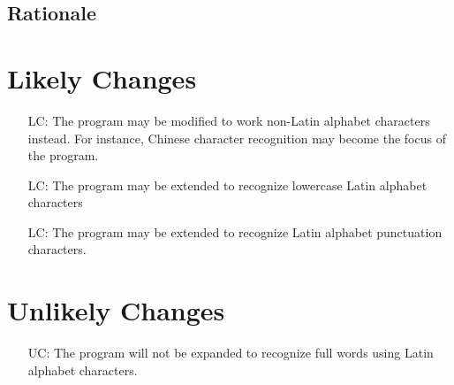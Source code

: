 \documentclass[12pt]{article}
\newcounter{lcnum} %
\newcounter{ucnum} %
\begin{document}
\begin{itemize}


\end{itemize}

\subsection{Rationale}


\section{Likely Changes}    

\noindent \begin{itemize}

\item[LC\refstepcounter{lcnum}\thelcnum\label{LC_Language}:] The program may be
modified to work non-Latin alphabet characters instead. For instance, Chinese
character recognition may become the focus of the program.
\item[LC\refstepcounter{lcnum}\thelcnum\label{LC_Lowercase}:] The program may be
extended to recognize lowercase Latin alphabet characters
\item[LC\refstepcounter{lcnum}\thelcnum\label{LC_Punctuation}:] The program may be
extended to recognize Latin alphabet punctuation characters.

\end{itemize}

\section{Unlikely Changes}    

\noindent \begin{itemize}

\item[UC\refstepcounter{ucnum}\theucnum\label{UC_Words}:] The program will not
be expanded to recognize full words using Latin alphabet characters.

\end{itemize}
\end{document}
